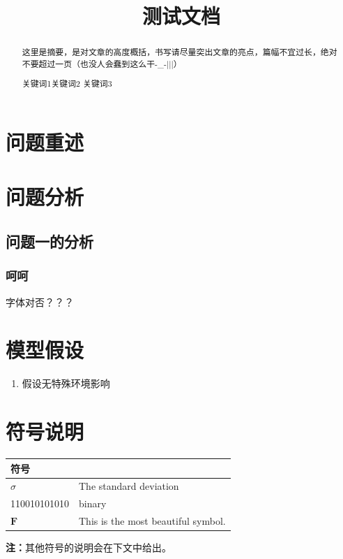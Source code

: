\documentclass[12pt]{article}%
\title{测试文档}
\begin{document}
\begin{abstract}
这里是摘要，是对文章的高度概括，书写请尽量突出文章的亮点，篇幅不宜过长，绝对不要超过一页（也没人会蠢到这么干-\_-|||）
\begin{keywords}
    关键词1\quad 关键词2 \quad 关键词3
\end{keywords}
\end{abstract}

\maketitle

\newpage
\section{问题重述}


\section{问题分析}
\subsection{问题一的分析}
\subsubsection{呵呵}
字体对否？？？


\section{模型假设}
\begin{enumerate}
\item 假设无特殊环境影响
\end{enumerate}

\section{符号说明}
\begin{center}
\begin{tabular}{C{3cm} L{8cm}}%
    \toprule[2pt]
    \textbf{符号} & \\
    \hline
    $\sigma$ & The standard deviation\\
    110010101010 & binary \\
    $\mathbf{F}$ & This is the most beautiful symbol. \\
    \bottomrule[2pt]
\end{tabular}
\end{center}
\textbf{注：}其他符号的说明会在下文中给出。
\end{document}
